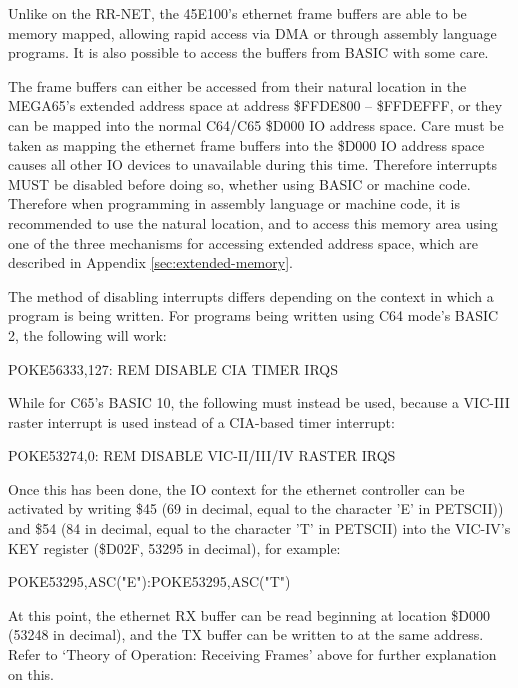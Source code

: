 Unlike on the RR-NET, the 45E100's ethernet frame buffers are able to be memory mapped, allowing rapid access via DMA
or through assembly language programs.  It is also possible to access the buffers from BASIC with some care.

The frame buffers can either be accessed from their natural location in the MEGA65's extended address space at address
\$FFDE800 -- \$FFDEFFF, or they can be mapped into the normal C64/C65 \$D000 IO address space.  Care must be
taken as mapping the ethernet frame buffers into the \$D000 IO address space causes all other IO devices to unavailable
during this time.  Therefore interrupts MUST be disabled before doing so, whether using BASIC or machine code.  Therefore
when programming in assembly language or machine code, it is recommended to use the natural location, and to access this
memory area using one of the three mechanisms for accessing extended address space, which are described in Appendix
\ref{sec:extended-memory}.

The method of
disabling interrupts differs depending on the context in which a program is being written. For programs being written using C64 mode's BASIC 2, the following will work:

\begin{screenoutput}
  POKE56333,127: REM DISABLE CIA TIMER IRQS
\end{screenoutput}

While for C65's BASIC 10, the following must instead be used, because a VIC-III raster interrupt is used instead of a CIA-based timer interrupt:

\begin{screenoutput}
POKE53274,0: REM DISABLE VIC-II/III/IV RASTER IRQS
\end{screenoutput}

Once this has been done, the IO context for the ethernet controller can be activated by writing \$45 (69 in decimal, equal to the character 'E' in PETSCII)) and \$54 (84 in decimal, equal to the character 'T' in PETSCII) into the VIC-IV's KEY register (\$D02F, 53295 in decimal), for example:

\begin{screenoutput}
POKE53295,ASC("E"):POKE53295,ASC("T")
\end{screenoutput}

At this point, the ethernet RX buffer can be read beginning at location \$D000 (53248 in decimal), and the TX buffer can be written to at the same address.  Refer to `Theory of Operation: Receiving Frames' above for further explanation on this.

